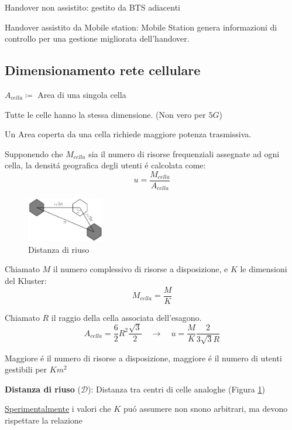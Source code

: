 \documentclass{article}
\begin{document}
Handover non assistito: gestito da BTS adiacenti

Handover assistito da Mobile station: Mobile Station genera informazioni di controllo per una gestione migliorata dell'handover.

\subsection{Dimensionamento rete cellulare}

$A_{cella} \coloneqq$ Area di una singola cella

Tutte le celle hanno la stessa dimensione. (Non vero per $5G$)

Un Area coperta da una cella richiede maggiore potenza trasmissiva.

Supponendo che $M_{cella}$ sia il numero di risorse frequenziali assegnate ad ogni cella, la densit\'a geografica degli utenti \'e calcolata come:
\[ u = \frac{M_{cella}}{A_{cella}} \]


\begin{figure}
    \includegraphics[width=0.3\textwidth]{img/sdt/distanza_riuso}
    \centering
    \caption{Distanza di riuso\label{dist-riuso}}
\end{figure}
Chiamato $M$ il numero complessivo di risorse a disposizione, e $K$ le dimensioni del Kluster:
\[ M_{cella} = \frac{M}{K} \]

Chiamato $R$ il raggio della cella associata dell'esagono.
\[ A_{cella} = \frac{6}{2}R^2\frac{\sqrt{3}}{2} \quad \rightarrow \quad
    u=\frac{M}{K}\frac{2}{3\sqrt{3}R}
\]

Maggiore \'e il numero di risorse a disposizione, maggiore \'e il numero di utenti gestibili per $Km^2$

\textbf{Distanza di riuso} ($\mathcal{D}$): Distanza tra centri di celle analoghe (Figura \ref{dist-riuso})

\underline{Sperimentalmente} i valori che $K$ pu\'o assumere non snono arbitrari, ma devono rispettare la relazione
\end{document}
